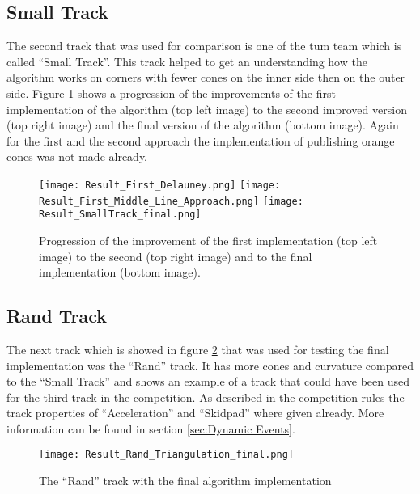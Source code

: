 \subsection{Small Track} \label{sec:Results Small Track}
The second track that was used for comparison is one of the \acrlong{tum} team which is called ``Small Track''. \cite{tumftm_optimization_algoritm} This track helped to get an understanding how the algorithm works on corners with fewer cones on the inner side then on the outer side. Figure \ref{fig:Result small track} shows a progression of the improvements of the first implementation of the algorithm (top left image) to the second improved version (top right image) and the final version of the algorithm (bottom image). Again for the first and the second approach the implementation of publishing orange cones was not made already.

\begin{figure}[H]
    \centering
    \texttt{[image: Result\_First\_Delauney.png]}\hfill
    \texttt{[image: Result\_First\_Middle\_Line\_Approach.png]}
    \texttt{[image: Result\_SmallTrack\_final.png]}
    \caption{Progression of the improvement of the first implementation (top left image) to the second (top right image) and to the final implementation (bottom image).}
    \label{fig:Result small track}
\end{figure}

\subsection{Rand Track} \label{sec:Results Rand Track}
The next track which is showed in figure \ref{fig:Result final middle line rand track} that was used for testing the final implementation was the ``Rand'' track. It has more cones and curvature compared to the ``Small Track'' and shows an example of a track that could have been used for the third track in the competition. As described in the competition rules the track properties of ``Acceleration'' and ``Skidpad'' where given already. More information can be found in section \ref{sec:Dynamic Events}.
\begin{figure}[H]
    \centering
    \texttt{[image: Result\_Rand\_Triangulation\_final.png]}
    \caption{The ``Rand'' track with the final algorithm implementation}
    \label{fig:Result final middle line rand track}
\end{figure}

